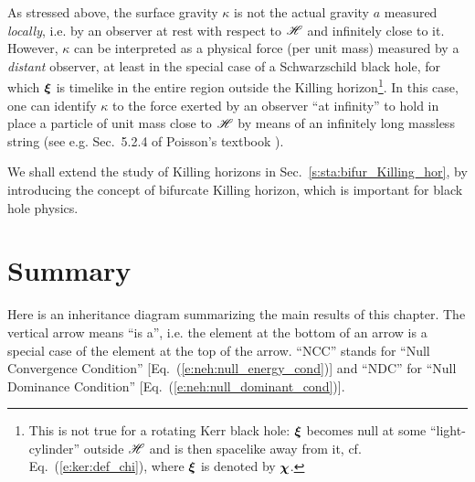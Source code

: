 \begin{remark}
As stressed above, the surface gravity $\kappa$ is not the
actual gravity $a$ measured \emph{locally}, i.e. by an observer at rest with
respect to $\mathscr{H}$ and infinitely close to it. However, $\kappa$ can be interpreted
as a physical force (per unit mass) measured by a \emph{distant} observer,
at least in the special case of a Schwarzschild black hole, for which
$\bm{\xi}$ is timelike in the entire region outside the Killing horizon\footnote{This is not true for a rotating Kerr black hole:
$\bm{\xi}$ becomes null at some ``light-cylinder'' outside $\mathscr{H}$ and is then
spacelike away from it, cf. Eq.~(\ref{e:ker:def_chi}),
where $\bm{\xi}$ is denoted by $\bm{\chi}$.}. In this case, one can identify $\kappa$
to the force exerted by an observer ``at infinity'' to hold in place a particle
of unit mass close to $\mathscr{H}$ by means of an infinitely long massless string
(see e.g. Sec.~5.2.4 of Poisson's textbook \cite{Poiss04}).
\end{remark}

\begin{remark}
We shall extend the study of Killing horizons in Sec.~\ref{s:sta:bifur_Killing_hor},
by introducing the concept of bifurcate Killing horizon, which is important
for black hole physics.
\end{remark}


\section{Summary}

Here is an inheritance diagram summarizing the main results of this chapter.
The vertical arrow means ``is a'', i.e. the element at the bottom of an arrow
is a special case of the element at the top of the arrow.
``NCC'' stands for ``Null Convergence Condition'' [Eq.~(\ref{e:neh:null_energy_cond})]
and ``NDC'' for ``Null Dominance Condition'' [Eq.~(\ref{e:neh:null_dominant_cond})].

